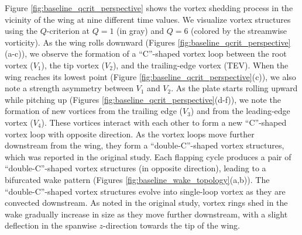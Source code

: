 Figure \ref{fig:baseline_qcrit_perspective} shows the vortex shedding process in the vicinity of the wing at nine different time values.
We visualize vortex structures using the $Q$-criterion at $Q = 1$ (in gray) and $Q = 6$ (colored by the streamwise vorticity).
As the wing rolls downward (Figures \ref{fig:baseline_qcrit_perspective}(a-c)), we observe the formation of a ``C''-shaped vortex loop between the root vortex ($V_1$), the tip vortex ($V_2$), and the trailing-edge vortex (TEV).
When the wing reaches its lowest point (Figure \ref{fig:baseline_qcrit_perspective}(c)), we also note a strength asymmetry between $V_1$ and $V_2$.
As the plate starts rolling upward while pitching up (Figures \ref{fig:baseline_qcrit_perspective}(d-f)), we note the formation of new vortices from the trailing edge ($V_3$) and from the leading-edge vortex ($V_4$).
These vortices interact with each other to form a new ``C''-shaped vortex loop with opposite direction.
As the vortex loops move further downstream from the wing, they form a ``double-C''-shaped vortex structures, which was reported in the original study.
Each flapping cycle produces a pair of ``double-C''-shaped vortex structures (in opposite direction), leading to a bifurcated wake pattern (Figures \ref{fig:baseline_wake_topology}(a,b)).
The ``double-C''-shaped vortex structures evolve into single-loop vortex as they are convected downstream.
As noted in the original study, vortex rings shed in the wake gradually increase in size as they move further downstream, with a slight deflection in the spanwise $z$-direction towards the tip of the wing.

